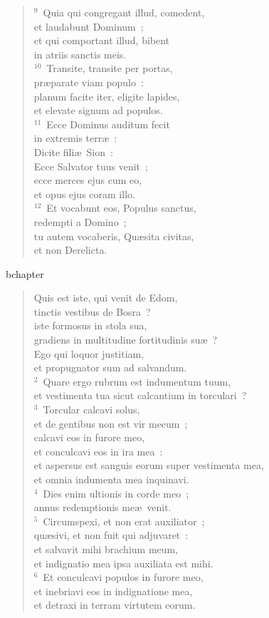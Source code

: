 \begin{verse}
${}^{9}$~Quia qui congregant illud, comedent,\\ et laudabunt Dominum~;\\ et qui comportant illud, bibent\\ in atriis sanctis meis.\\
${}^{10}$~Transite, transite per portas,\\ pr\ae parate viam populo~:\\ planum facite iter, eligite lapides,\\ et elevate signum ad populos.\\
${}^{11}$~Ecce Dominus auditum fecit\\ in extremis terr\ae~:\\ Dicite fili\ae\ Sion~:\\ Ecce Salvator tuus venit~;\\ ecce merces ejus cum eo,\\ et opus ejus coram illo.\\
${}^{12}$~Et vocabunt eos, Populus sanctus,\\ redempti a Domino~;\\ tu autem vocaberis, Qu\ae sita civitas,\\ et non Derelicta.\end{verse}


bchapter\begin{verse}\vspace{-19pt}Quis est iste, qui venit de Edom,\\ tinctis vestibus de Bosra~?\\ iste formosus in stola sua,\\ gradiens in multitudine fortitudinis su\ae~?\\ Ego qui loquor justitiam,\\ et propugnator sum ad salvandum.\\
${}^{2}$~Quare ergo rubrum est indumentum tuum,\\ et vestimenta tua sicut calcantium in torculari~?\\
${}^{3}$~Torcular calcavi solus,\\ et de gentibus non est vir mecum~;\\ calcavi eos in furore meo,\\ et conculcavi eos in ira mea~:\\ et aspersus est sanguis eorum super vestimenta mea,\\ et omnia indumenta mea inquinavi.\\
${}^{4}$~Dies enim ultionis in corde meo~;\\ annus redemptionis me\ae\ venit.\\
${}^{5}$~Circumspexi, et non erat auxiliator~;\\ qu\ae sivi, et non fuit qui adjuvaret~:\\ et salvavit mihi brachium meum,\\ et indignatio mea ipsa auxiliata est mihi.\\
${}^{6}$~Et conculcavi populos in furore meo,\\ et inebriavi eos in indignatione mea,\\ et detraxi in terram virtutem eorum.\end{verse}


